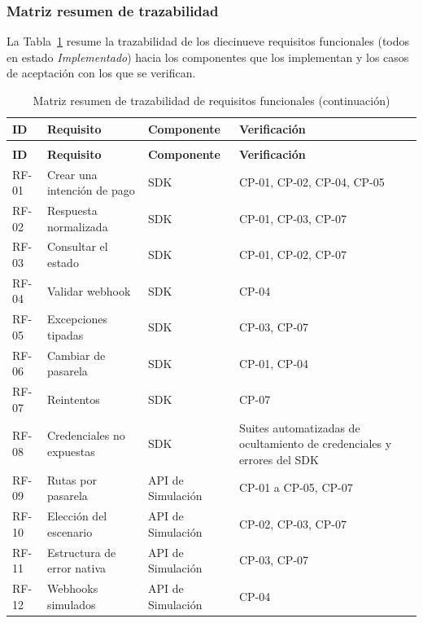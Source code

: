 \subsubsection{Matriz resumen de trazabilidad}
La Tabla~\ref{tab:trazabilidad-memoria} resume la trazabilidad de los diecinueve requisitos funcionales (todos en estado \textit{Implementado}) hacia los componentes que los implementan y los casos de aceptación con los que se verifican.

{\small
\renewcommand{\arraystretch}{1.18}
\begin{longtable}{|>{\raggedright\arraybackslash}p{1.2cm}|>{\raggedright\arraybackslash}p{4.8cm}|>{\raggedright\arraybackslash}p{3.2cm}|>{\raggedright\arraybackslash}p{4.5cm}|}
\caption{Matriz resumen de trazabilidad de requisitos funcionales}\label{tab:trazabilidad-memoria}\\
\hline
\textbf{ID} & \textbf{Requisito} & \textbf{Componente} & \textbf{Verificación} \\ \hline
\endfirsthead
\caption[]{Matriz resumen de trazabilidad de requisitos funcionales (continuación)}\\
\hline
\textbf{ID} & \textbf{Requisito} & \textbf{Componente} & \textbf{Verificación} \\ \hline
\endhead
\hline
\endfoot
RF-01 & Crear una intención de pago & SDK & CP-01, CP-02, CP-04, CP-05 \\ \hline
RF-02 & Respuesta normalizada & SDK & CP-01, CP-03, CP-07 \\ \hline
RF-03 & Consultar el estado & SDK & CP-01, CP-02, CP-07 \\ \hline
RF-04 & Validar webhook & SDK & CP-04 \\ \hline
RF-05 & Excepciones tipadas & SDK & CP-03, CP-07 \\ \hline
RF-06 & Cambiar de pasarela & SDK & CP-01, CP-04 \\ \hline
RF-07 & Reintentos & SDK & CP-07 \\ \hline
RF-08 & Credenciales no expuestas & SDK & Suites automatizadas de ocultamiento de credenciales y errores del SDK \\ \hline
RF-09 & Rutas por pasarela & API de Simulación & CP-01 a CP-05, CP-07 \\ \hline
RF-10 & Elección del escenario & API de Simulación & CP-02, CP-03, CP-07 \\ \hline
RF-11 & Estructura de error nativa & API de Simulación & CP-03, CP-07 \\ \hline
RF-12 & Webhooks simulados & API de Simulación & CP-04 \\ \hline

\end{longtable}}
